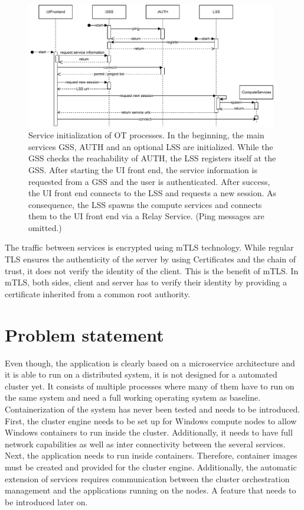 \begin{figure}[h]
	\centering
	\includegraphics[width=0.98\textwidth]{Figures/opentwin-network-communication-sequence.pdf}
	\caption{Service initialization of \ac{OT} processes. In the beginning, the main services \ac{GSS}, \ac{AUTH} and an optional \ac{LSS} are initialized. While the \ac{GSS} checks the reachability of \ac{AUTH}, the \ac{LSS} registers itself at the \ac{GSS}. After starting the \ac{UI} front end, the service information is requested from a \ac{GSS} and the user is authenticated. After success, the \ac{UI} front end connects to the \ac{LSS} and requests a new session. As consequence, the \ac{LSS} spawns the compute services and connects them to the \ac{UI} front end via a Relay Service. (Ping messages are omitted.)}
	\label{fig:ot-network-communication-sequence}
\end{figure}

The traffic between services is encrypted using \ac{mTLS} technology. While regular \ac{TLS} ensures the authenticity of the server by using Certificates and the chain of trust, it does not verify the identity of the client. This is the benefit of \ac{mTLS}. In \ac{mTLS}, both sides, client and server has to verify their identity by providing a certificate inherited from a common root authority.

\section{Problem statement}
Even though, the application is clearly based on a microservice architecture and it is able to run on a distributed system, it is not designed for a automated cluster yet. It consists of multiple processes where many of them have to run on the same system and need a full working operating system as baseline. Containerization of the system has never been tested and needs to be introduced. 
First, the cluster engine needs to be set up for \ac{Windows} compute nodes to allow \ac{Windows} containers to run inside the cluster. Additionally, it needs to have full network capabilities as well as inter connectivity between the several services.
Next, the application needs to run inside containers. Therefore, container images must be created and provided for the cluster engine. 
Additionally, the automatic extension of services requires communication between the cluster orchestration management and the applications running on the nodes. A feature that needs to be introduced later on.

